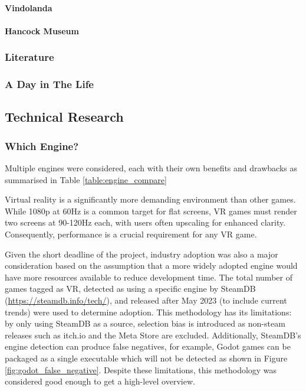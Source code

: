 \documentclass[sigconf,authordraft]{acmart}
\begin{document}
\paragraph{Vindolanda}

\paragraph{Hancock Museum}

\subsubsection{Literature}

\subsubsection{A Day in The Life}

\subsection{Technical Research}

\subsubsection{Which Engine?}

Multiple engines were considered, each with their own benefits
and drawbacks as summarised in Table \ref{table:engine_compare}

Virtual reality is a significantly more demanding environment than other games.
While 1080p at 60Hz is a common target for flat screens, VR games must render
two screens at 90-120Hz each, with users often upscaling for enhanced clarity.
Consequently, performance is a crucial requirement for any VR game.

Given the short deadline of the project, industry adoption was also a major
consideration based on the assumption that a more widely adopted engine would
have more resources available to reduce development time. The total number of
games tagged as VR, detected as using a specific engine by
SteamDB (\url{https://steamdb.info/tech/}), and released
after May 2023 (to include current trends) were used to determine adoption.
This methodology has its limitations: by only using SteamDB as a source,
selection bias is introduced as non-steam releases such as itch.io and the Meta
Store are excluded. Additionally, SteamDB's engine detection can produce false
negatives, for example, Godot games can be packaged as a single executable which
will not be detected as shown in Figure \ref{fig:godot_false_negative}. Despite
these limitations, this methodology was considered good enough to get a
high-level overview.
\end{document}
